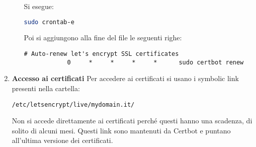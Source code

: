 \begin{enumerate}
\begin{itemize}
        Si esegue:
        \begin{lstlisting}[language=bash]
            sudo crontab-e
        \end{lstlisting}
        Poi si aggiungono alla fine del file le seguenti righe:
        \begin{lstlisting}[language=text]
            # Auto-renew let's encrypt SSL certificates
            0     *     *     *     *      sudo certbot renew
        \end{lstlisting}
    \end{itemize}
    \item \textbf{Accesso ai certificati}\newline
    Per accedere ai certificati si usano i symbolic link presenti nella cartella:
    \begin{lstlisting}[language=textnonum]
    /etc/letsencrypt/live/mydomain.it/
    \end{lstlisting}
    Non si accede direttamente ai certificati perché questi hanno una scadenza, di solito di alcuni mesi.
    Questi link sono mantenuti da Certbot e puntano all'ultima versione dei certificati.
\end{enumerate}

